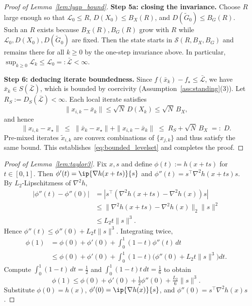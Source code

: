 \documentclass[review,onefignum,onetabnum]{siamart171218}
\begin{document}
\begin{proof}[Proof of Lemma~\ref{lem:lyap_bound}]
		\noindent\textbf{Step 5a: closing the invariance.}
		Choose $R$ large enough so that
		$\mathcal L_0\le R$,
		$D(X_0)\le B_X(R)$, and
		$D(\tilde G_0)\le B_G(R)$.
		Such an $R$ exists because $B_X(R),B_G(R)$ grow with $R$
		while $\mathcal L_0,D(X_0),D(\tilde G_0)$ are fixed.
		Then the state starts in $\mathcal S(R,B_X,B_G)$
		and remains there for all $k\ge0$ by the one-step invariance above.
		In particular, $\sup_{k\ge0}\mathcal L_k\le \mathcal L_0=:\bar{\mathcal L}<\infty$.
		
		\smallskip
		\noindent\textbf{Step 6: deducing iterate boundedness.}
		Since $f(\bar x_k)-f_\star\le\bar{\mathcal L}$, we have
		$\bar x_k\in S(\bar{\mathcal L})$,
		which is bounded by coercivity (Assumption~\ref{ass:standing}(3)).
		Let $R_S:=D_S(\bar{\mathcal L})<\infty$.
		Each local iterate satisfies
		\[
		\|x_{i,k}-\bar x_k\|\le\sqrt{N}\,D(X_k)\le\sqrt{N}\,B_X,
		\]
		and hence
		\[
		\|x_{i,k}-x_\star\|
		\;\le\;
		\|\bar x_k-x_\star\|+\|x_{i,k}-\bar x_k\|
		\;\le\;
		R_S + \sqrt{N}\,B_X
		\;=:\; D.
		\]
		Pre-mixed iterates $\tilde x_{i,k}$ are convex combinations of
		$\{x_{j,k}\}$ and thus satisfy the same bound.
		This establishes~\eqref{eq:bounded_levelset} and completes the proof.
	\end{proof}
	
	\begin{proof}[Proof of Lemma~\ref{lem:taylor3}]
		Fix $x,s$ and define $\phi(t):=h(x+ts)$ for $t\in[0,1]$.
		Then $\phi'(t)=\ip{\nabla h(x+ts)}{s}$ and $\phi''(t)=s^\top\nabla^2 h(x+ts)s$.
		By $L_2$-Lipschitzness of $\nabla^2 h$,
		\begin{align*}
			|\phi''(t)\!-\!\phi''(0)|
			&=|s^\top(\nabla^2 h(x\!+\!ts)\!-\!\nabla^2 h(x))s|\\
			&\le \|\nabla^2 h(x\!+\!ts)\!-\!\nabla^2 h(x)\|_2\|s\|^2\\
			&\le L_2 t\|s\|^3.
		\end{align*}
		Hence $\phi''(t)\le \phi''(0)+L_2 t\|s\|^3$.
		Integrating twice,
		\begin{align*}
			\phi(1)&=\phi(0)+\phi'(0)+\int_0^1\!(1\!-\!t)\phi''(t)\,dt\\
			&\le \phi(0)+\phi'(0)+\!\int_0^1\!(1\!-\!t)\big(\phi''(0)+L_2 t\|s\|^3\big)dt.
		\end{align*}
		Compute $\int_0^1(1-t)\,dt=\tfrac12$ and $\int_0^1(1-t)t\,dt=\tfrac16$ to obtain
		\[
		\phi(1)\le \phi(0)+\phi'(0)+\tfrac12\phi''(0)+\tfrac{L_2}{6}\|s\|^3.
		\]
		Substitute $\phi(0)=h(x)$, $\phi'(0)=\ip{\nabla h(x)}{s}$, and $\phi''(0)=s^\top\nabla^2 h(x)s$.
	\end{proof}
	
\end{document}
